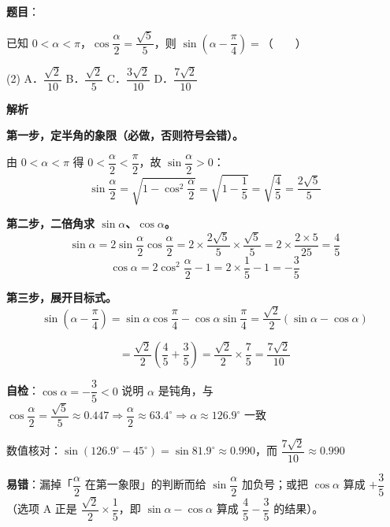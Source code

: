 \begin{answer}

\textbf{题目}：

已知 $0<\alpha<\pi$，$\cos\dfrac{\alpha}{2}=\dfrac{\sqrt5}{5}$，则 $\sin\left(\alpha-\dfrac{\pi}{4}\right)=$\mbox{（　　）}

\begin{gkopts}(2)
\task A．$\dfrac{\sqrt2}{10}$
\task B．$\dfrac{\sqrt2}{5}$
\task C．$\dfrac{3\sqrt2}{10}$
\task D．$\dfrac{7\sqrt2}{10}$
\end{gkopts}

\textbf{解析}

\textbf{第一步，定半角的象限（必做，否则符号会错）。}

由 $0<\alpha<\pi$ 得 $0<\dfrac\alpha2<\dfrac\pi2$，故 $\sin\dfrac\alpha2>0$：
\nopagebreak[4]
\[\sin\frac\alpha2=\sqrt{1-\cos^2\frac\alpha2}=\sqrt{1-\frac15}=\sqrt{\frac45}=\frac{2\sqrt5}{5}\]

\textbf{第二步，二倍角求 $\sin\alpha$、$\cos\alpha$。}
\nopagebreak[4]
\[\sin\alpha=2\sin\frac\alpha2\cos\frac\alpha2=2\times\frac{2\sqrt5}{5}\times\frac{\sqrt5}{5}=2\times\frac{2\times5}{25}=\frac45\]
\nopagebreak[4]
\[\cos\alpha=2\cos^2\frac\alpha2-1=2\times\frac15-1=-\frac35\]

\textbf{第三步，展开目标式。}
\nopagebreak[4]
\[\sin\left(\alpha-\frac\pi4\right)=\sin\alpha\cos\frac\pi4-\cos\alpha\sin\frac\pi4=\frac{\sqrt2}{2}\left(\sin\alpha-\cos\alpha\right)\]

\nopagebreak[4]
\[=\frac{\sqrt2}{2}\left(\frac45+\frac35\right)=\frac{\sqrt2}{2}\times\frac75=\frac{7\sqrt2}{10}\]

\begin{gktip}
\textbf{自检}：$\cos\alpha=-\dfrac35<0$ 说明 $\alpha$ 是钝角，与 $\cos\dfrac\alpha2=\dfrac{\sqrt5}{5}\approx0.447\Rightarrow\dfrac\alpha2\approx63.4^\circ\Rightarrow\alpha\approx126.9^\circ$ 一致 

数值核对：$\sin\left(126.9^\circ-45^\circ\right)=\sin81.9^\circ\approx0.990$，而 $\dfrac{7\sqrt2}{10}\approx0.990$ 

\textbf{易错}：漏掉「$\dfrac\alpha2$ 在第一象限」的判断而给 $\sin\dfrac\alpha2$ 加负号；或把 $\cos\alpha$ 算成 $+\dfrac35$（选项 A 正是 $\dfrac{\sqrt2}{2}\times\dfrac15$，即 $\sin\alpha-\cos\alpha$ 算成 $\dfrac45-\dfrac35$ 的结果）。
\end{gktip}


\par\medskip

\end{answer}

